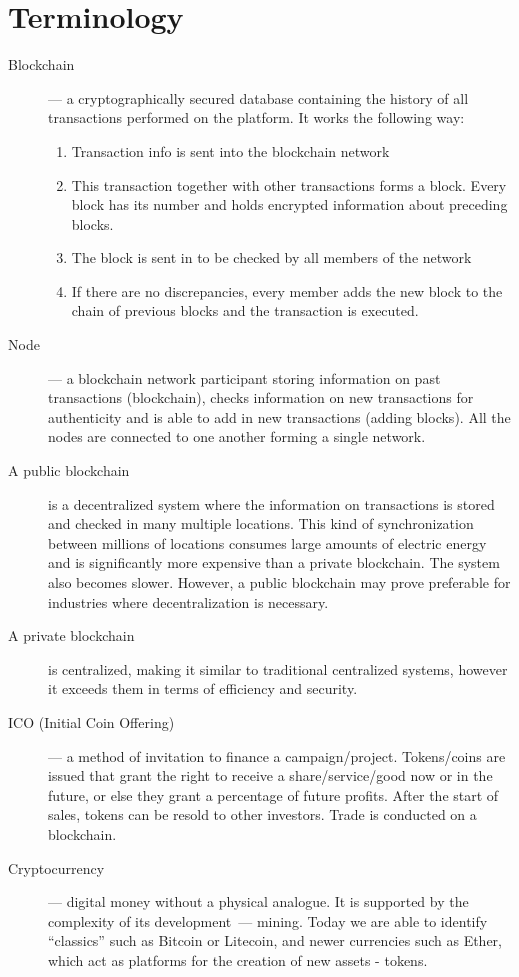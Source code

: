 \documentclass{article}
\begin{document}
\newpage
\appendix

\section{Terminology}
\begin{description}
\item[Blockchain]--- a cryptographically secured database containing the history of all transactions performed on the platform. It works the following way:
\begin{enumerate}
\item Transaction info is sent into the blockchain network
\item This transaction together with other transactions forms a block. Every block has its number and holds encrypted information about preceding blocks. 
\item The block is sent in to be checked by all members of the network
\item If there are no discrepancies, every member adds the new block to the chain of previous blocks and the transaction is executed. 
\end{enumerate}
\item[Node]--- a blockchain network participant storing information on past transactions (blockchain), checks information on new transactions for authenticity and is able to add in new transactions (adding blocks). All the nodes are connected to one another forming a single network. 
\item[A public blockchain] is a decentralized system where the information on transactions is stored and checked in many multiple locations. This kind of synchronization between millions of locations consumes large amounts of electric energy and is significantly more expensive than a private blockchain. The system also becomes slower. However, a public blockchain may prove preferable for industries where decentralization is necessary. 
\item[A private blockchain] is centralized, making it similar to traditional centralized systems, however it exceeds them in terms of efficiency and security.
\item[ICO (Initial Coin Offering)]--- a method of invitation to finance a campaign/project. Tokens/coins are issued that grant the right to receive a share/service/good now or in the future, or else they grant a percentage of future profits. After the start of sales, tokens can be resold to other investors. Trade is conducted on a blockchain. 
\item[Cryptocurrency]--- digital money without a physical analogue. It is supported by the complexity of its development~--- mining. Today we are able to identify \enquote{classics} such as Bitcoin or Litecoin, and newer currencies such as Ether, which act as platforms for the creation of new assets - tokens.

\end{description}
\end{document}
